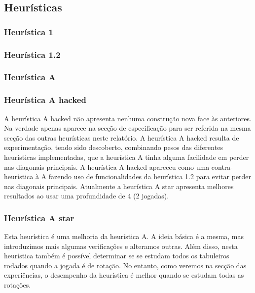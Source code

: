 \newpage
\subsection{Heurísticas}

\subsubsection{Heurística 1}


\subsubsection{Heurística 1.2}


\subsubsection{Heurística A}


\subsubsection{Heurística A hacked}

A heurística A hacked não apresenta nenhuma construção nova face às anteriores. Na verdade apenas aparece na secção de especificação para ser referida na mesma secção das outras heurísticas neste relatório. A heurística A hacked resulta de experimentação, tendo sido descoberto, combinando pesos das diferentes heurísticas implementadas, que a heurística A tinha alguma facilidade em perder nas diagonais principais. A heurística A hacked apareceu como uma contra-heurística à A fazendo uso de funcionalidades da heurística 1.2 para evitar perder nas diagonais principais. Atualmente a heurística A star apresenta melhores resultados ao usar uma profundidade de 4 (2 jogadas).

\subsubsection{Heurística A star}

Esta heurística é uma melhoria da heurística A. A ideia básica é a mesma, mas introduzimos mais algumas verificações e alteramos outras. Além disso, nesta heurística também é possível determinar se se estudam todos os tabuleiros rodados quando a jogada é de rotação. No entanto, como veremos na secção das experiências, o desempenho da heurística é melhor quando se estudam todas as rotações.

